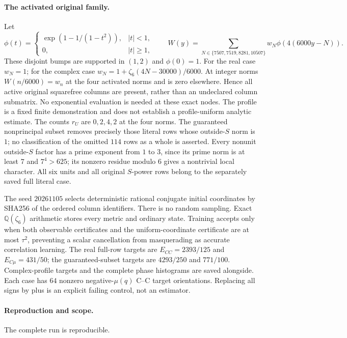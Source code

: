 \documentclass[11pt]{article}
\theoremstyle{definition}\newtheorem{definition}[theorem]{Definition}
\theoremstyle{remark}\newtheorem{remark}[theorem]{Remark}
\begin{document}
\paragraph{The activated original family.}
Let
\[
 \phi(t)=\begin{cases}\exp(1-1/(1-t^2)),&|t|<1,\\0,&|t|\ge1,\end{cases}
 \qquad W(y)=\sum_{N\in\{7507,7519,8281,10507\}}
                     w_N\phi(4(6000y-N)).
\]
These disjoint bumps are supported in $(1,2)$ and $\phi(0)=1$.
For the real case $w_N=1$; for the complex case
$w_N=1+\zeta_6(4N-30000)/6000$.
At integer norms $W(n/6000)=w_n$ at the four activated norms and is zero
elsewhere. Hence all active original squarefree columns are present, rather
than an undeclared column submatrix. No exponential evaluation is needed
at these exact nodes. The profile is a fixed finite demonstration and does
not establish a profile-uniform analytic estimate.
The counts $r_U$ are $0,2,4,2$ at the four norms.
The guaranteed nonprincipal subset removes precisely those literal rows whose
outside-$S$ norm is $1$; no classification of the omitted $114$ rows as a
whole is asserted. Every nonunit outside-$S$ factor has a prime exponent
from $1$ to $3$, since its prime norm is at least $7$ and $7^4>625$;
its nonzero residue modulo $6$ gives a nontrivial local character.
All six units and all original $S$-power rows belong to
the separately saved full literal case.

The seed $20261105$ selects deterministic rational conjugate initial
coordinates by SHA256 of the ordered column identifiers. There is no random
sampling. Exact $\mathbb Q(\zeta_6)$ arithmetic stores every metric and
ordinary state. Training accepts only when both observable certificates and
the uniform-coordinate certificate are at most $\tau^2$, preventing a
scalar cancellation from masquerading as accurate correlation learning.
The real full-row targets are $E_{CC}=2393/125$ and $E_{C\mu}=431/50$;
the guaranteed-subset targets are $4293/250$ and $771/100$.
Complex-profile targets and the complete phase histograms are saved alongside.
Each case has $64$ nonzero negative-$\mu(q)$ C--C target orientations.
Replacing all signs by plus is an explicit failing control, not an estimator.

\paragraph{Reproduction and scope.} The complete run is reproducible.
\end{document}
